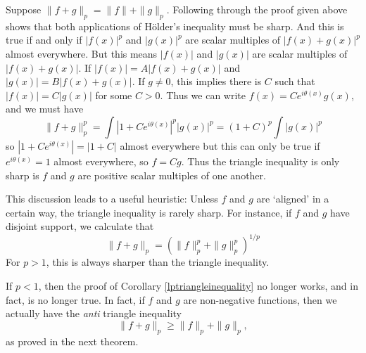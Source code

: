 \begin{remark}
  Suppose $\| f + g \|_p = \| f \| + \| g \|_p$. Following through the proof given above shows that both applications of H\"{o}lder's inequality must be sharp. And this is true if and only if $|f(x)|^p$ and $|g(x)|^p$ are scalar multiples of $|f(x) + g(x)|^p$ almost everywhere. But this means $|f(x)|$ and $|g(x)|$ are scalar multiples of $|f(x) + g(x)|$. If $|f(x)| = A|f(x) + g(x)|$ and $|g(x)| = B|f(x) + g(x)|$. If $g \neq 0$, this implies there is $C$ such that $|f(x)| = C |g(x)|$ for some $C > 0$. Thus we can write $f(x) = C e^{i \theta(x)} g(x)$, and we must have
  \[ \| f + g \|_p^p = \int |1 + C e^{i \theta(x)}|^p |g(x)|^p = (1 + C)^p \int |g(x)|^p \]
  so $|1 + Ce^{i \theta(x)}| = |1 + C|$ almost everywhere but this can only be true if $e^{i \theta(x)} = 1$ almost everywhere, so $f = C g$. Thus the triangle inequality is only sharp is $f$ and $g$ are positive scalar multiples of one another.
\end{remark}

This discussion leads to a useful heuristic: Unless $f$ and $g$ are `aligned' in a certain way, the triangle inequality is rarely sharp. For instance, if $f$ and $g$ have disjoint support, we calculate that
%
\[ \| f + g \|_p = \left( \| f \|_p^p + \| g \|_p^p \right)^{1/p} \]
%
For $p > 1$, this is always sharper than the triangle inequality.

If $p < 1$, then the proof of Corollary \ref{lptriangleinequality} no longer works, and in fact, is no longer true. In fact, if $f$ and $g$ are non-negative functions, then we actually have the \emph{anti} triangle inequality
%
\[ \| f + g \|_p \geq \| f \|_p + \| g \|_p, \]
%
as proved in the next theorem.

